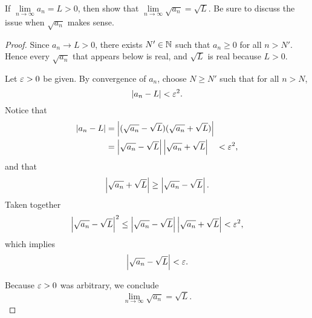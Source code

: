 \begin{problem}
  
  If $\lim\limits_{n \to \infty} a_n = L > 0$, then show that $\lim\limits_{n \to \infty} \sqrt{a_n} = \sqrt{L}$. Be sure to discuss
  the issue when $\sqrt{a_{n}}$ makes sense.

  \begin{proof}
    Since $a_{n} \to L > 0$, there exists $N' \in \mathbb{N}$ such that
    $a_{n} \ge 0$ for all $n > N'$.  Hence every $\sqrt{a_{n}}$ that appears
    below is real, and $\sqrt{L}$ is real because $L > 0$.

    Let $\varepsilon > 0$ be given. By convergence of $a_{n}$, choose $N \ge N'$ such that
    for all $n > N$,
    \[
      \left\lvert a_{n} - L \right\rvert< \varepsilon^{2}.
    \]
    Notice that 
    \begin{align*}
      \left\lvert a_{n} - L \right\rvert &= \left\lvert (\sqrt{a_n} - \sqrt{L})(\sqrt{a_n} + \sqrt{L}) \right\rvert \\
                      &= \left\lvert \sqrt{a_n} - \sqrt{L} \right\rvert\left\lvert \sqrt{a_n} + \sqrt{L} \right\rvert \quad < \varepsilon^{2},
    \end{align*}
    and that
    \[
      \left\lvert \sqrt{a_{n}} + \sqrt{L} \right\rvert \geq \left\lvert \sqrt{a_n} - \sqrt{L} \right\rvert.
    \]
    Taken together
    \[
      \left\lvert \sqrt{a_{n}} - \sqrt{L} \right\rvert^{2} \leq \left\lvert \sqrt{a_{n}} - \sqrt{L} \right\rvert\left\lvert \sqrt{a_{n}} + \sqrt{L} \right\rvert < \varepsilon^{2},
    \]
    which implies
    \[
      \left\lvert \sqrt{a_{n}} - \sqrt{L} \right\rvert < \varepsilon.
    \]

    Because $\varepsilon > 0$ was arbitrary, we conclude
    \[
      \lim_{n \to \infty} \sqrt{a_{n}} = \sqrt{L}.
    \]
  \end{proof}

\end{problem}

